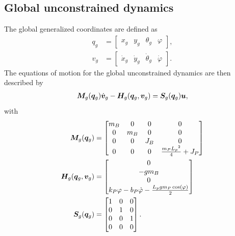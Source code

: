 \documentclass[DC2017114Bouma.tex]{subfiles}
\begin{document}
\subsection*{Global unconstrained dynamics}
The global generalized coordinates are defined as
\begin{align}
q_g &= \begin{bmatrix}
x_g & y_g & \theta_g & \varphi
\end{bmatrix},\\
v_g &= \begin{bmatrix}
\dot{x}_g & \dot{y}_g & \dot{\theta}_g & \dot{\varphi}
\end{bmatrix}.
\end{align}
The equations of motion for the global unconstrained dynamics are then described by
\begin{align}
{\boldsymbol{M}}_g({\boldsymbol{q}}_g)\dot{{\boldsymbol{v}}}_g - {\boldsymbol{H}}_g({\boldsymbol{q}}_g,{\boldsymbol{v}}_g) = {\boldsymbol{S}}_g({\boldsymbol{q}}_g){\boldsymbol{u}},
\end{align}
with
\begin{align}
{\boldsymbol{M}}_g({\boldsymbol{q}}_g) &= \begin{bmatrix}
m_B & 0 & 0 & 0\\ 0 & m_B & 0 & 0\\ 0 & 0 & J_B & 0\\ 0 & 0 & 0 & \frac{m_P{L_p}^2}{4}+J_P
\end{bmatrix} \\
{\boldsymbol{H}}_g({\boldsymbol{q}}_g,{\boldsymbol{v}}_g) &= \begin{bmatrix}
0\\ -gm_B\\ 0\\ k_P\varphi -b_P\dot{\varphi}-\frac{L_pgm_P\cos\left(\varphi \right)}{2}
\end{bmatrix} \\
{\boldsymbol{S}}_g({\boldsymbol{q}}_g) &= \begin{bmatrix}
1 & 0 & 0 \\
0 & 1 & 0 \\
0 & 0 & 1 \\
0 & 0 & 0 
\end{bmatrix}.
\end{align}
\end{document}
